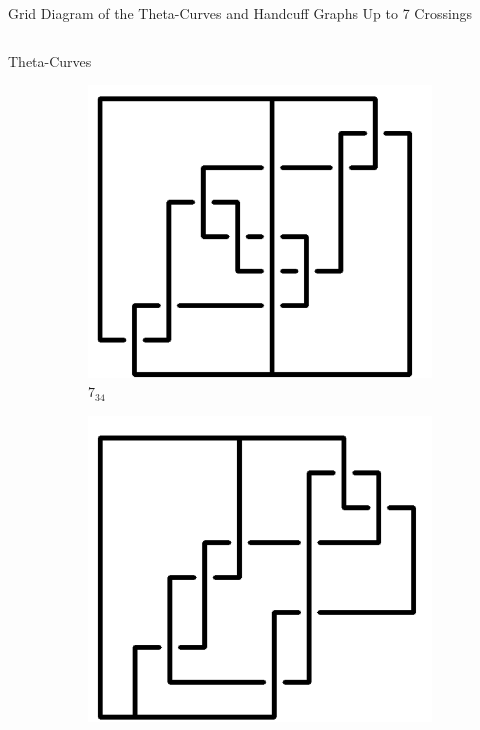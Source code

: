\documentclass[final]{beamer}
\begin{document}
\begin{frame}[t]
\begin{alertblock}{Grid Diagram of the Theta-Curves and Handcuff Graphs Up to 7 Crossings}
\begin{columns}[t]
\begin{column}{0.5\textwidth}
\begin{alertblock}{Theta-Curves}
\begin{figure}
\begin{subfigure}{0.075\textwidth}
    \end{subfigure}
    \begin{subfigure}{0.075\textwidth}
    \includegraphics[width=\columnwidth]{../Midterm_Poster/grid_diagram/theta_7_34.png}
    \caption{$7_{34}$} 
    \end{subfigure}
    \begin{subfigure}{0.075\textwidth}
    \includegraphics[width=\columnwidth]{../Midterm_Poster/grid_diagram/theta_7_35.png}

\end{subfigure}
\end{figure}
\end{alertblock}
\end{column}
\end{columns}
\end{alertblock}
\end{frame}
\end{document}
